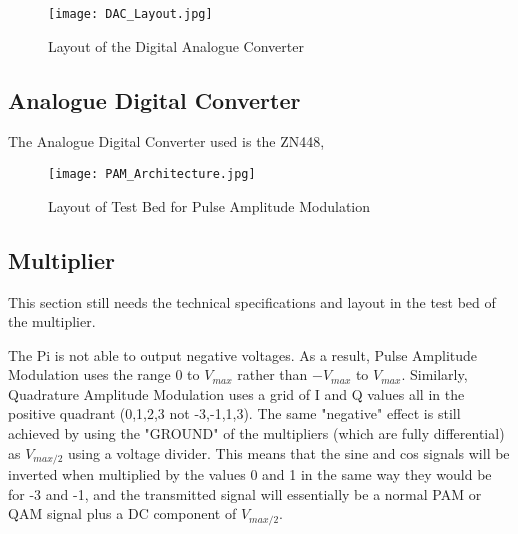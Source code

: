 \documentclass[../main.tex]{subfiles}
\begin{document}
\begin{figure}[ht]
	\centering
	\texttt{[image: DAC\_Layout.jpg]}
	\caption{Layout of the Digital Analogue Converter}
	\label{fig_DAC Layout}
\end{figure}

\subsection{Analogue Digital Converter}

The Analogue Digital Converter used is the ZN448, 

\begin{figure}[ht]
	\centering
	\texttt{[image: PAM\_Architecture.jpg]}
	\caption{Layout of Test Bed for Pulse Amplitude Modulation}
\end{figure}

\subsection{Multiplier} \label{sec_Multiplier}

This section still needs the technical specifications and layout in the test bed of the multiplier.



The Pi is not able to output negative voltages.
As a result, Pulse Amplitude Modulation uses the range $0$ to $V_{max}$ rather than $-V_{max}$ to $V_{max}$.
Similarly, Quadrature Amplitude Modulation uses a grid of I and Q values all in the positive quadrant (0,1,2,3 not -3,-1,1,3).
The same "negative" effect is still achieved by using the "GROUND" of the multipliers (which are fully differential)
as $V_{max/2}$ using a voltage divider.
This means that the sine and cos signals will be inverted when multiplied by the values 0 and 1 in the same way they would be for -3 and -1, and the transmitted signal will essentially be a normal PAM or QAM signal plus a DC component of $V_{max/2}$.
\end{document}
